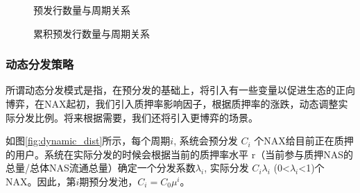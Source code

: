 \begin{figure}
\centering
\begin{minipage}[5cm]{.45\textwidth}
\centering
\caption{预发行数量与周期关系}\label{dist}

\vspace{\baselineskip}
\end{minipage}\qquad
\begin{minipage}[5cm]{.45\textwidth}
\centering
\caption{累积预发行数量与周期关系}\label{acc}
\end{minipage}
\end{figure}

\subsubsection{动态分发策略}
所谓动态分发模式是指，在预分发的基础上，将引入有一些变量以促进生态的正向博弈，在NAX起初，我们引入质押率影响因子，根据质押率的涨跌，动态调整实际分发比例。将来根据需要，我们还将引入更博弈的场景。

如图\ref{fig:dynamic_dist}所示，每个周期$i$, 系统会预分发 $C_i$ 个NAX给目前正在质押的用户。系统在实际分发的时候会根据当前的质押率水平 r（当前参与质押NAS的总量/总体NAS流通总量）确定一个分发系数$\lambda_i$, 实际分发 $C_i$$\lambda_i$ (0<$\lambda_i$<1)个NAX。因此，第\(i\)期预分发池，\(C_i = C_0 \mu^i\)。

